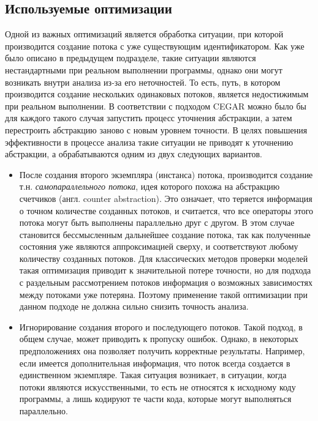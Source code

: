 \subsection{Используемые оптимизации}
\label{sect_thread_create}
Одной из важных оптимизаций является обработка ситуации, при которой производится создание потока с уже существующим идентификатором. 
Как уже было описано в предыдущем подразделе, такие ситуации являются нестандартными при реальном выполнении программы, однако они могут возникать внутри анализа из-за его неточностей.
То есть, путь, в котором производится создание нескольких одинаковых потоков, является недостижимым при реальном выполнении.
В соответствии с подходом CEGAR можно было бы для каждого такого случая запустить процесс уточнения абстракции, а затем перестроить абстракцию заново с новым уровнем точности.
В целях повышения эффективности в процессе анализа такие ситуации не приводят к уточнению абстракции, а обрабатываются одним из двух следующих вариантов.

\begin{itemize}
\item После создания второго экземпляра (инстанса) потока, производится создание т.н. \textit{самопараллельного потока}, идея которого похожа на абстракцию счетчиков (англ. counter abstraction).
Это означает, что теряется информация о точном количестве созданных потоков, и считается, что все операторы этого потока могут быть выполнены параллельно друг с другом.
В этом случае становится бессмысленным дальнейшее создание потока, так как полученные состояния уже являются аппроксимацией сверху, и соответствуют любому количеству созданных потоков.
Для классических методов проверки моделей такая оптимизация приводит к значительной потере точности, но для подхода с раздельным рассмотрением потоков информация о возможных зависимостях между потоками уже потеряна.
Поэтому применение такой оптимизации при данном подходе не должна сильно снизить точность анализа.

\item Игнорирование создания второго и последующего потоков. 
Такой подход, в общем случае, может приводить к пропуску ошибок. 
Однако, в некоторых предположениях она позволяет получить корректные результаты.
Например, если имеется дополнительная информация, что поток всегда создается в единственном экземпляре.
Такая ситуация возникает, в ситуации, когда потоки являются искусственными, то есть не относятся к исходному коду программы, а лишь кодируют те части кода, которые могут выполняться параллельно.

\end{itemize}

